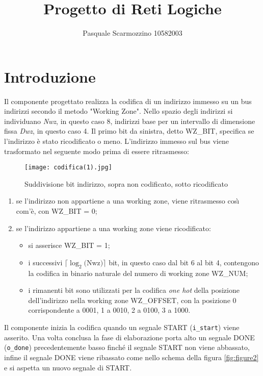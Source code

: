 \documentclass [a4paper, 12pt]{article}
\title{Progetto di Reti Logiche}
\author{Pasquale Scarmozzino 10582003}
\begin{document}
\maketitle

\newpage

\tableofcontents

\newpage

\section{Introduzione}
 Il componente progettato realizza la codifica di un indirizzo immesso su un bus indirizzi secondo il metodo "Working Zone". Nello spazio degli indirizzi si individuano \textit{Nwz}, in questo caso 8, indirizzi base per un intervallo di dimensione fissa \textit{Dwz}, in questo caso 4. Il primo bit da sinistra, detto WZ\_BIT, specifica se l'indirizzo \`e stato ricodificato o meno. L'indirizzo immesso sul bus viene trasformato nel seguente modo prima di essere ritrasmesso:
 \begin{wrapfigure}{l}{0.25\textwidth}
\texttt{[image: codifica(1).jpg]} 
\caption{Suddivisione bit indirizzo, 
sopra non codificato, sotto ricodificato}
\label{fig:wrapfig}
\end{wrapfigure}
\begin{enumerate}
	\item se l'indirizzo non appartiene a una working zone, viene ritrasmesso cos\`{\i} com'\`e, con WZ\_BIT = 0;
	\item se l'indirizzo appartiene a una working zone viene ricodificato:
\begin{itemize}
	\item si asserisce WZ\_BIT = 1;
	\item i successivi $\lceil\log_2 \mbox{(Nwz)}\rceil$ bit, in questo caso dal bit 6 
al bit 4, contengono la codifica in binario naturale del numero di working zone WZ\_NUM;
	\item i rimanenti bit sono utilizzati per la codifica \textit{one hot} della posizione dell'indirizzo nella working zone WZ\_OFFSET, con la posizione 0 corrispondente a 0001, 1 a 0010, 2 a 0100, 3 a 1000.
\end{itemize}
\end{enumerate}

Il componente inizia la codifica quando un segnale START (\texttt{i\_start}) viene asserito. Una volta conclusa la fase di elaborazione porta alto un segnale DONE (\texttt{o\_done}) precedentemente basso finch\'e il segnale START non viene abbassato, infine il segnale DONE viene ribassato come nello schema della figura \ref{fig:figure2} e si aspetta un nuovo segnale di START.
\end{document}
